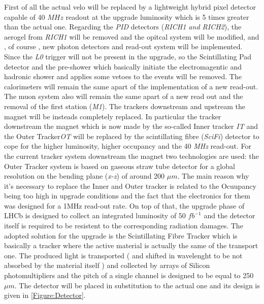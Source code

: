 \documentclass[paper=a4, fontsize=10pt]{scrartcl}
\numberwithin{equation}{section}		%
\numberwithin{figure}{section}			%
\numberwithin{table}{section}				%
\begin{document}
First of all the actual velo will be replaced by a lightweight hybrid pixel detector capable of 40 $MHz$ readout at the upgrade luminosity which is 5 times greater than the actual one.
Regarding the \textit{PID} detectors (\textit{RICH1 and RICH2}), the aerogel from \textit{RICH1} will be removed and the opitcal system will be modified, and , of course , new photon detectors and read-out system will be implemented. Since the \textit{L0} trigger will not be present in the upgrade, so the Scintillating Pad detector and the pre-shower which basically initiate the electromagentic and hadronic shower and applies some vetoes to the events will be removed. The calorimeters will remain the same apart of the implementation of a new read-out. The muon system also will remain the same apart of a new read out and the removal of the first station (\textit{M1}).
The trackers downstream and upstream the magnet will be insteads completely replaced. 
In particular the tracker downstream the magnet which is now made by the so-called Inner tracker \textit{IT} and the Outer Tracker\textit{OT} will be replaced by the scintillating fibre (\textit{SciFi}) detector to cope for the higher luminosity, higher occupancy and the 40 \textit{MHz} read-out.
For the current tracker system downstream the magnet two technologies are used: the Outer Tracker system is based on gaseous straw tube detector for a global resolution on the bending plane (\textit{x-z}) of around 200 $\mu m$.
The main reason why it's necessary to replace the Inner and Outer tracker is related to the Ocuupancy being too high in upgrade conditions and the fact that the electronics for them was designed for a 1MHz read-out rate. On top of that, the upgrade phase of LHCb is designed to collect an integrated luminosity of 50 $fb^{-1}$ and the detector itself is required to be resistent to the corresponding radiation damages.
The adopted solution for the upgrade is the Scintillating Fibre Tracker which is basically a tracker where the active material is actually the same of the transport one. The produced light is transported ( and shifted in wavelenght to be not absorbed by the material itself ) and collected by arrays of Silicon photomultipliers and the pitch of a single channel is designed to be equal to 250 $\mu m$.
The detector will be placed in substitution to the actual one and its design is given in \ref{Figure:Detector}.
\end{document}
